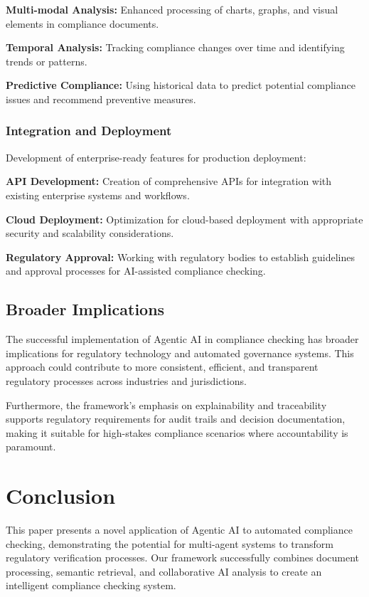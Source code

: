 \documentclass[conference]{IEEEtran}
\begin{document}
\textbf{Multi-modal Analysis:} Enhanced processing of charts, graphs, and visual elements in compliance documents.

\textbf{Temporal Analysis:} Tracking compliance changes over time and identifying trends or patterns.

\textbf{Predictive Compliance:} Using historical data to predict potential compliance issues and recommend preventive measures.

\subsubsection{Integration and Deployment}
Development of enterprise-ready features for production deployment:

\textbf{API Development:} Creation of comprehensive APIs for integration with existing enterprise systems and workflows.

\textbf{Cloud Deployment:} Optimization for cloud-based deployment with appropriate security and scalability considerations.

\textbf{Regulatory Approval:} Working with regulatory bodies to establish guidelines and approval processes for AI-assisted compliance checking.

\subsection{Broader Implications}

The successful implementation of Agentic AI in compliance checking has broader implications for regulatory technology and automated governance systems. This approach could contribute to more consistent, efficient, and transparent regulatory processes across industries and jurisdictions.

Furthermore, the framework's emphasis on explainability and traceability supports regulatory requirements for audit trails and decision documentation, making it suitable for high-stakes compliance scenarios where accountability is paramount.

\section{Conclusion}

This paper presents a novel application of Agentic AI to automated compliance checking, demonstrating the potential for multi-agent systems to transform regulatory verification processes. Our framework successfully combines document processing, semantic retrieval, and collaborative AI analysis to create an intelligent compliance checking system.
\end{document}
